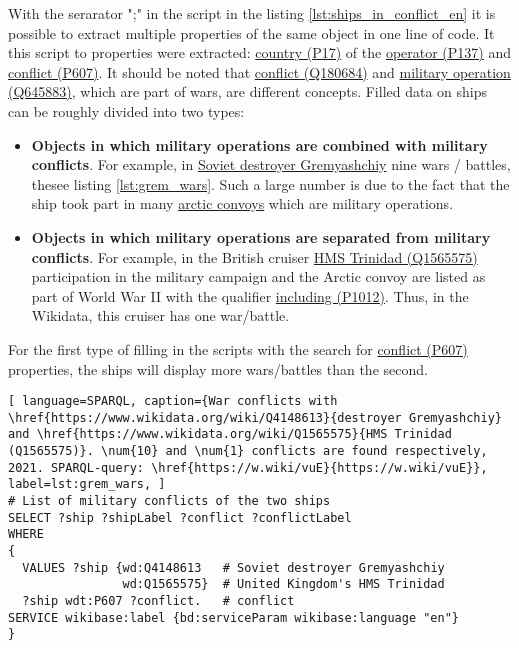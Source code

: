 With the serarator ";" in the script in the listing \ref{lst:ships_in_conflict_en} it is possible to extract multiple properties of the same object in one line of code. It this script to properties were extracted: \href{https://www.wikidata.org/wiki/Property:P17}{country (P17)} of the \href{https://www.wikidata.org/wiki/Property:P137}{operator (P137)} and \href{https://www.wikidata.org/wiki/Property:P607}{conflict (P607)}. It should be noted that \href{https://www.wikidata.org/wiki/Q180684}{conflict (Q180684)} and \href{https://www.wikidata.org/wiki/Q645883}{military operation (Q645883)}, which are part of wars, are different concepts. Filled data on ships can be roughly divided into two types:

\begin{itemize}
  \item \textbf{Objects in which military operations are combined with military conflicts}. For example, in \href{https://www.wikidata.org/wiki/Q4148613}{Soviet destroyer Gremyashchiy} nine wars / battles, thesee listing \ref{lst:grem_wars}. Such a large number is due to the fact that the ship took part in many \href{https://en.wikipedia.org/wiki/Arctic_convoys_of_World_War_II}{arctic convoys} which are military operations.
  
  \item \textbf{Objects in which military operations are separated from military conflicts}. For example, in the British cruiser \href{https://www.wikidata.org/wiki/Q1565575}{HMS Trinidad (Q1565575)} participation in the military campaign and the Arctic convoy are listed as part of World War II with the qualifier \href{https://www.wikidata.org/wiki/Property:P1012}{including (P1012)}. Thus, in the Wikidata, this cruiser has one war/battle.
\end{itemize}

For the first type of filling in the scripts with the search for \href{https://www.wikidata.org/wiki/Property:P607}{conflict (P607)} properties, the ships will display more wars/battles than the second. 

\begin{lstlisting}[ language=SPARQL, caption={War conflicts with \href{https://www.wikidata.org/wiki/Q4148613}{destroyer Gremyashchiy} and \href{https://www.wikidata.org/wiki/Q1565575}{HMS Trinidad (Q1565575)}. \num{10} and \num{1} conflicts are found respectively, 2021. SPARQL-query: \href{https://w.wiki/vuE}{https://w.wiki/vuE}}, label=lst:grem_wars, ]
# List of military conflicts of the two ships 
SELECT ?ship ?shipLabel ?conflict ?conflictLabel
WHERE
{
  VALUES ?ship {wd:Q4148613   # Soviet destroyer Gremyashchiy
                wd:Q1565575}  # United Kingdom's HMS Trinidad
  ?ship wdt:P607 ?conflict.   # conflict
SERVICE wikibase:label {bd:serviceParam wikibase:language "en"}
}
\end{lstlisting}

